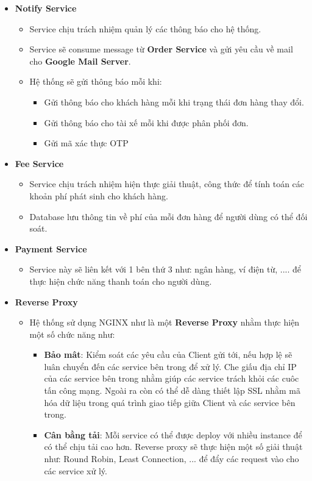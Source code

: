 \begin{itemize}
\begin{itemize}
			\end{itemize}
			\item \textbf{Notify Service}
			\begin{itemize}
				\item Service chịu trách nhiệm quản lý các thông báo cho hệ thống.
				\item Service sẽ consume message từ \textbf{Order Service} và gửi yêu cầu về mail cho \textbf{Google Mail Server}.
				\item Hệ thống sẽ gửi thông báo mỗi khi: 
					\begin{itemize}
						\item Gửi thông báo cho khách hàng mỗi khi trạng thái đơn hàng thay đổi. 
						\item Gửi thông báo cho tài xế mỗi khi được phân phối đơn.
						\item Gửi mã xác thực OTP
					\end{itemize}
			\end{itemize}
			\item \textbf{Fee Service}
			\begin{itemize}
				\item Service chịu trách nhiệm hiện thực giải thuật, công thức để tính toán các khoản phí phát sinh cho khách hàng.
				\item Database lưu thông tin về phí của mỗi đơn hàng để người dùng có thể đối soát.
			\end{itemize}
			\item \textbf{Payment Service}
			\begin{itemize}
				\item Service này sẽ liên kết với 1 bên thứ 3 như: ngân hàng, ví điện từ, .... để thực hiện chức năng thanh toán cho người dùng.
			\end{itemize}
			\item \textbf{Reverse Proxy}
			\begin{itemize}
				\item Hệ thống sử dụng NGINX như là một \textbf{Reverse Proxy} nhằm thực hiện một số chức năng như: 
				\begin{itemize}
					\item \textbf{Bảo mât}: Kiểm soát các yêu cầu của Client gửi tới, nếu hợp lệ sẽ luân chuyển đến các service bên trong để xử lý. Che giấu địa chỉ IP của các service bên trong nhằm giúp các service trách khỏi các cuôc tấn công mạng. Ngoài ra còn có thể dễ dàng thiết lập SSL nhằm mã hóa dữ liệu trong quá trình giao tiếp giữa Client và các service bên trong.
					\item \textbf{Cân bằng tải}: Mỗi service có thể được deploy với nhiều instance để có thể chịu tải cao hơn. Reverse proxy sẽ thực hiện một số giải thuật như: Round Robin, Least Connection, ... để đẩy các request vào cho các service xử lý.
				\end{itemize}
			\end{itemize}
			

\end{itemize}
